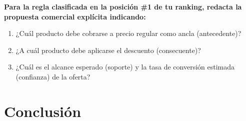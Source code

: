 \documentclass[letterpaper,11pt]{article}
\begin{document}
\textbf{Para la regla clasificada en la posición \#1 de tu ranking, redacta la propuesta comercial explícita
indicando:}

\begin{enumerate}
  \item ¿Cuál producto debe cobrarse a precio regular como ancla (antecedente)?
  \item ¿A cuál producto debe aplicarse el descuento (consecuente)?
  \item ¿Cuál es el alcance esperado (soporte) y la tasa de conversión estimada (confianza) de la
oferta?
\end{enumerate}

\newpage
\section{Conclusión}


\clearpage
{}
\begingroup
\makeatletter
\let\ps@plain\ps@referencias
\makeatother
\pagestyle{referencias}
\thispagestyle{referencias}
\renewcommand{\refname}{Bibliografías}
\nocite{referencia}


\clearpage


\endgroup
\end{document}
